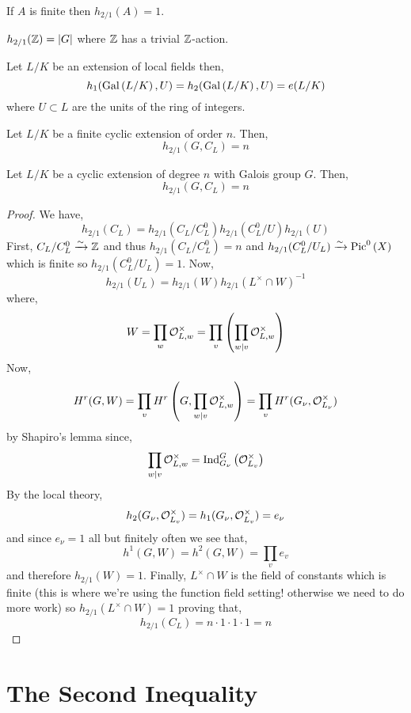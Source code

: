 \documentclass[12pt]{article}
\begin{document}
\begin{prop}
If $A$ is finite then $h_{2/1}(A) = 1$.
\end{prop}

\begin{prop}
$h_{2/1}(\mathbb{Z}) = |G|$ where $\mathbb{Z}$ has a trivial $\mathbb{Z}$-action.
\end{prop}

\begin{prop}
Let $L/K$ be an extension of local fields then,
\[ h_{1}(\mathrm{Gal}\left( L/K \right), U) = h_{2}(\mathrm{Gal}\left( L/K \right), U) = e(L/K) \]
where $U \subset L$ are the units of the ring of integers. 
\end{prop}

\begin{defn}
Let $L/K$ be a finite cyclic extension of order $n$. Then,
\[ h_{2/1}(G, C_L) = n \] 
\end{defn}

\begin{theorem}
Let $L/K$ be a cyclic extension of degree $n$ with Galois group $G$. Then,
\[ h_{2/1}(G, C_L) = n \]
\end{theorem}

\begin{proof}
We have,
\[ h_{2/1}(C_L) = h_{2/1}(C_L/C_L^0) h_{2/1}(C_L^0/U) h_{2/1}(U) \]
First, $C_L/C_L^0 \xrightarrow{\sim} \mathbb{Z}$ and thus $h_{2/1}(C_L/C_L^0) = n$ and $h_{2/1}(C_L^0/U_L) \xrightarrow{\sim} \mathrm{Pic}^0\left( X \right)$ which is finite so $h_{2/1}(C_L^0/U_L) = 1$. Now,
\[ h_{2/1}(U_L) = h_{2/1}(W) h_{2/1}(L^\times \cap W)^{-1} \]
where,
\[ W = \prod_{w} \mathcal{O}_{L, w}^\times = \prod_{v} \left( \prod_{w \mid v} \mathcal{O}_{L, w}^\times \right) \]
Now,
\[ H^r(G, W) = \prod_{v} H^r \left(G, \prod_{w \mid v} \mathcal{O}_{L, w}^\times \right) = \prod_{v} H^r(G_\nu, \mathcal{O}_{L_\nu}^\times)  \]
by Shapiro's lemma since,
\[ \prod_{w \mid v} \mathcal{O}_{L, w}^\times = \mathrm{Ind}^{G}_{G_\nu} \left( \mathcal{O}_{L_v}^\times \right) \]
By the local theory, 
\[ h_2(G_\nu, \mathcal{O}_{L_v}^\times) = h_1(G_\nu, \mathcal{O}_{L_v}^\times) = e_\nu \]
and since $e_\nu = 1$ all but finitely often we see that,
\[ h^1(G, W) = h^2(G, W) = \prod_{v} e_v \]
and therefore $h_{2/1}(W) = 1$. Finally, $L^\times \cap W$ is the field of constants which is finite (this is where we're using the function field setting! otherwise we need to do more work) so $h_{2/1}(L^\times \cap W) = 1$ proving that,
\[ h_{2/1}(C_L) = n \cdot 1 \cdot 1 \cdot 1 = n \]
\end{proof}

\section{The Second Inequality}
\end{document}
